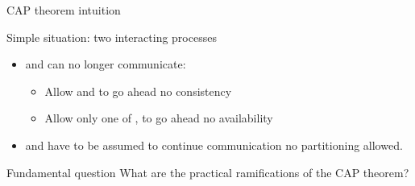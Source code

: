 \begin{slide}{CAP theorem intuition}
  \begin{block}{Simple situation: two interacting processes}
    \begin{itemize}
    \item {} and  can no longer communicate:
      \begin{itemize}
      \item Allow  and  to go ahead \mathexpr{\Rightarrow} no consistency
      \item Allow only one of ,  to go ahead \mathexpr{\Rightarrow} no availability
      \end{itemize}
    \item {} and  have to be assumed to continue communication \mathexpr{\Rightarrow} no
      partitioning allowed.
    \end{itemize}
  \end{block}

  \begin{alertblock}{Fundamental question}
    What are the practical ramifications of the CAP theorem?
  \end{alertblock}
\end{slide}
